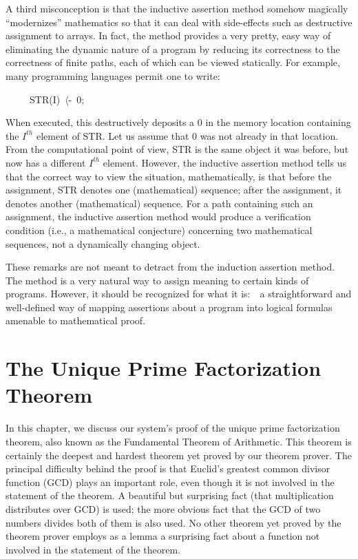\documentclass[10pt]{book}
\newenvironment{pubasis}{\begin{flushleft}}{\end{flushleft}}
\begin{document}
A third misconception is that the inductive assertion method somehow
magically ``modernizes'' mathematics so that it can deal with side-effects
such as destructive assignment to arrays.  In fact,
the method provides a very pretty, easy way of eliminating the dynamic
nature of a program by reducing its correctness to the correctness
of finite paths, each of which can be viewed statically.
For example, many programming languages permit one to write:
\begin{pubasis}
~~~~~STR(I)~$\langle$-~0;\\
\end{pubasis}
When executed, this destructively deposits a 0 in the memory location containing the
$I^{th}$ element of STR.  Let us assume that 0 was not already in
that location.  From the computational point of view, STR is
the same object it was before, but now has a different $I^{th}$ element.
However, the inductive assertion method tells us that the correct
way to view the situation, mathematically, is that before the
assignment, STR denotes one (mathematical) sequence; after the assignment, it
denotes another (mathematical) sequence.  For a path containing
such an assignment, the inductive assertion method would produce
a verification condition (i.e., a mathematical conjecture)
concerning two mathematical sequences, not a dynamically changing object.

These remarks are not meant to detract from the induction assertion
method.  The method is a very natural way to assign meaning to certain kinds
of programs.
However, it should be recognized for what it is:~~a straightforward
and well-defined way of mapping
assertions about a program into logical formulas amenable to mathematical
proof.

\chapter{The Unique Prime Factorization Theorem}
\pagestyle{headings}
\label{SECPRIMEFACTORIZATION}
In this chapter, we discuss our system's  proof of the unique
prime factorization theorem, also known as the Fundamental Theorem of
Arithmetic.
This theorem is certainly the deepest and
hardest theorem yet proved by our theorem prover.  The
principal difficulty behind the proof is that Euclid's greatest common divisor
function (GCD)
plays an important role, even
though it is not involved in the statement of the theorem.
A beautiful but surprising fact (that
multiplication distributes over GCD) is used;  the more obvious
fact that the GCD of two numbers divides both
of them is also used.
No other theorem yet proved by the theorem prover employs as a lemma
a surprising fact about a function not involved in the statement of
the theorem.
\end{document}
